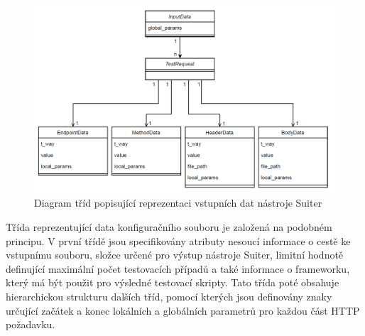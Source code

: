 \begin{figure}[hbt]
	\centering
	\includegraphics[width=1\textwidth]{obrazky-figures/InputClass3.png}
	\caption{Diagram tříd popisující reprezentaci vstupních dat nástroje Suiter}
	\label{fig_DiagramTridInput}
\end{figure}



Třída reprezentující data konfiguračního souboru je založená na podobném principu. V první třídě jsou specifikovány atributy nesoucí informace o cestě ke vstupnímu souboru, složce určené pro výstup nástroje Suiter, limitní hodnotě definující maximální počet testovacích případů a také informace o frameworku, který má být použit pro výsledné testovací skripty. Tato třída poté obsahuje hierarchickou strukturu dalších tříd, pomocí kterých jsou definovány znaky určující začátek a konec lokálních a globálních parametrů pro každou část HTTP požadavku. 


